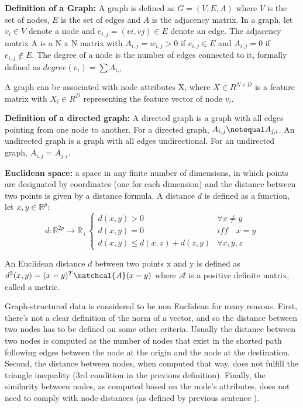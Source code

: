 \textbf{Definition of a Graph:} A graph is defined as $G = (V,E,A)$ where $V$ is the set of nodes, $E$ is the set of edges and $A$ is the adjacency matrix. In a graph, let $ v_{i} \in V $ denote a node and $ e_{i,j} = (vi, vj) \in E $ denote an edge. The adjacency matrix A is a N x N matrix with $A_{i,j} = w_{i,j} > 0$ if $e_{i,j} \in E$ and $A_{i,j}=0$ if $e_{i,j} \notin E$. The degree of a node is the number of edges connected to it, formally defined as $ degree(v_i) = \sum A_{i,:}$

A graph can be associated with node attributes X, where $X \in R^{N \times D}$ is a feature matrix with $X_i \in R^{D}$ representing the feature vector of node $v_i$. %

\textbf{Definition of a directed graph:} A directed graph is a graph with all edges pointing from one node to another. For a directed graph, $A_{i,j} \notequal A_{j,i}$. An undirected graph is a graph with all edges undirectional. For an undirected graph, $A_{i,j} = A_{j,i}$.


\textbf{Euclidean space:}  a space in any finite number of dimensions, in which points are designated by coordinates (one for each dimension) and the distance between two points is given by a distance formula.  A distance $d$ is defined as a function, let $x,y \in \mathbb{R}^p$:
$$d:\mathbb{R}^{2p} \to \mathbb{R}_{+} \begin{cases}

d(x,y)>0 & \forall x \neq y \\
d(x,y)=0 & iff \quad x=y \\
d(x,y) \leq d(x,z)+d(z,y) & \forall x,y,z

\end{cases}$$

An Euclidean distance $d$ between two points x and y is defined as $d^2(x,y)=(x-y)^T\matchcal{A}(x -y)$ where $\mathcal{A}$ is a positive definite matrix, called a metric.

Graph-structured data is considered to be non Euclidean for many reasons. First, there's not a clear definition of the norm of a vector, and so the distance between two nodes has to be defined on some other criteria. Usually the distance between two nodes is computed as the number of nodes that exist in the shorted path following edges between the node at the origin and the node at the destination. 
Second, the distance between nodes, when computed that way, does not fulfill the triangle inequality (3rd condition in the previous definition). Finally, the similarity between nodes, as computed based on the node's attributes, does not need to comply with node distances (as defined by previous sentence ).


